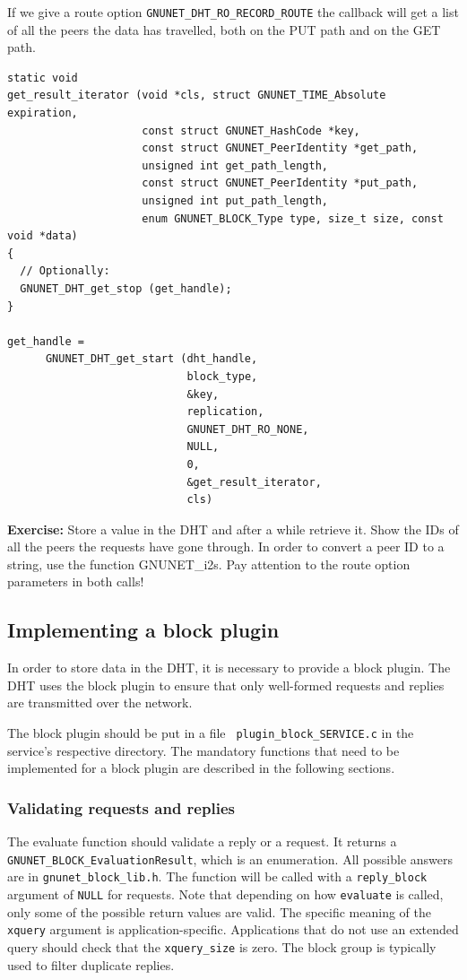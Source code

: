 \documentclass[10pt]{article}
\newcommand{\exercise}[1]{\noindent\begin{boxedminipage}{\textwidth}{\bf Exercise:} #1 \end{boxedminipage}}
\begin{document}
If we give a route option {\tt GNUNET\_DHT\_RO\_RECORD\_ROUTE} the callback
will get a list of all the peers the data has travelled, both on the PUT
path and on the GET path.
\lstset{language=C}
\begin{lstlisting}
static void
get_result_iterator (void *cls, struct GNUNET_TIME_Absolute expiration,
                     const struct GNUNET_HashCode *key,
                     const struct GNUNET_PeerIdentity *get_path,
                     unsigned int get_path_length,
                     const struct GNUNET_PeerIdentity *put_path,
                     unsigned int put_path_length,
                     enum GNUNET_BLOCK_Type type, size_t size, const void *data)
{
  // Optionally:
  GNUNET_DHT_get_stop (get_handle);
}

get_handle =
      GNUNET_DHT_get_start (dht_handle,
                            block_type,
                            &key,
                            replication,
                            GNUNET_DHT_RO_NONE,
                            NULL,
                            0,
                            &get_result_iterator,
                            cls)
\end{lstlisting}

\exercise{Store a value in the DHT and after a while retrieve it. Show the IDs of all
the peers the requests have gone through. In order to convert a peer ID to a string, use
the function GNUNET\_i2s. Pay attention to the route option parameters in both calls!}

\subsection{Implementing a block plugin}

In order to store data in the DHT, it is necessary to provide a block
plugin.  The DHT uses the block plugin to ensure that only well-formed
requests and replies are transmitted over the network.

The block plugin should be put in a file {\tt
  plugin\_block\_SERVICE.c} in the service's respective directory. The
mandatory functions that need to be implemented for a block plugin are
described in the following sections.

\subsubsection{Validating requests and replies}

The evaluate function should validate a reply or a request. It returns
a {\tt GNUNET\_BLOCK\_EvaluationResult}, which is an enumeration. All
possible answers are in {\tt gnunet\_block\_lib.h}.  The function will
be called with a {\tt reply\_block} argument of {\tt NULL} for
requests.  Note that depending on how {\tt evaluate} is called, only
some of the possible return values are valid.  The specific meaning of
the {\tt xquery} argument is application-specific.  Applications that
do not use an extended query should check that the {\tt xquery\_size}
is zero.  The block group is typically used to filter duplicate
replies.
\end{document}
